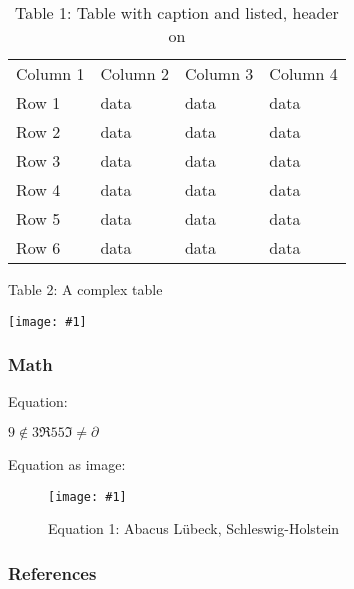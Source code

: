 \documentclass{article}
\newlength{\imgwidth}
\newcommand\scaledgraphics[2]{%
                
\settowidth{\imgwidth}{\texttt{[image: \#1]}}%
                
\setlength{\imgwidth}{\minof{\imgwidth}{#2\textwidth}}%
                
\texttt{[image: \#1]}%
                
}
\begin{document}
\begin{table}
\caption*{Table 1: Table with caption and listed, header on}\label{T66652301}

\begin{tabu} to \textwidth { |X|X|X|X| }
\hline



Column 1 & Column 2 & Column 3 & Column 4
 \\


Row 1 & data & data & data
 \\


Row 2 & data & data & data
 \\


Row 3 & data & data & data
 \\


Row 4 & data & data & data
 \\


Row 5 & data & data & data
 \\


Row 6 & data & data & data
 \\
\hline

\end{tabu}\end{table}


\begin{center}
\begin{table}
\caption*{Table 2: A complex table}\label{F8966261}
\scaledgraphics{7c6e8240-04b3-4fa7-84fb-b3855c905735.jpg}{0.5}
\end{table}


\end{center}


\subsubsection{Math}\label{H225619}



Equation:


$9\notin3\mathfrak{\Re }55\mathfrak{\Im }\ne\partial$


Equation as image:

\begin{figure}
\scaledgraphics{090b27be-b68d-4325-9442-7a94408dc0d0.jpg}{0.5}
\caption*{Equation 1:  Abacus Lübeck, Schleswig-Holstein}\label{F9394491}
\end{figure}


\subsubsection{References}\label{H7100180}
\end{document}
